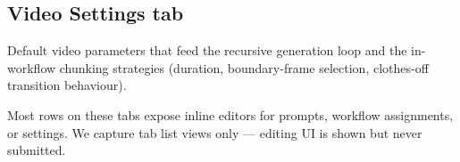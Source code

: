 \subsection{Video Settings tab}
Default video parameters that feed the recursive generation loop and the
in-workflow chunking strategies (duration, boundary-frame selection,
clothes-off transition behaviour).

\begin{designnote}
Most rows on these tabs expose inline editors for prompts, workflow
assignments, or settings. We capture tab list views only — editing UI is
shown but never submitted.
\end{designnote}
